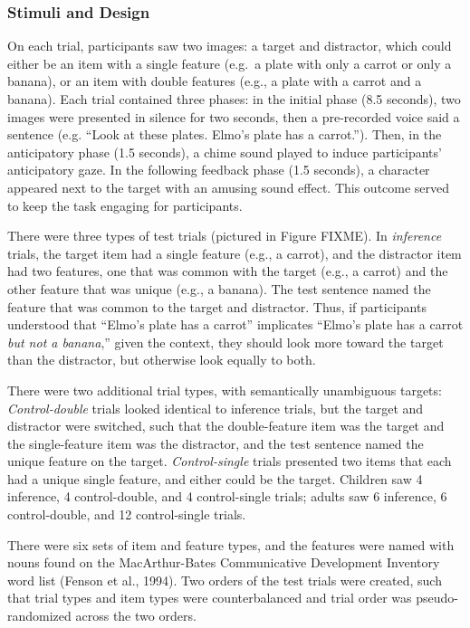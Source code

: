 \documentclass[a4paper,man,apacite,floatsintext]{apa6}
\begin{document}
\subsubsection{Stimuli and Design}\label{stimuli-and-design}

On each trial, participants saw two images: a target and distractor,
which could either be an item with a single feature (e.g.~a plate with
only a carrot or only a banana), or an item with double features (e.g.,
a plate with a carrot and a banana). Each trial contained three phases:
in the initial phase (8.5 seconds), two images were presented in silence
for two seconds, then a pre-recorded voice said a sentence (e.g. ``Look
at these plates. Elmo's plate has a carrot.''). Then, in the
anticipatory phase (1.5 seconds), a chime sound played to induce
participants' anticipatory gaze. In the following feedback phase (1.5
seconds), a character appeared next to the target with an amusing sound
effect. This outcome served to keep the task engaging for participants.

There were three types of test trials (pictured in Figure FIXME). In
\emph{inference} trials, the target item had a single feature (e.g., a
carrot), and the distractor item had two features, one that was common
with the target (e.g., a carrot) and the other feature that was unique
(e.g., a banana). The test sentence named the feature that was common to
the target and distractor. Thus, if participants understood that
``Elmo's plate has a carrot'' implicates ``Elmo's plate has a carrot
\emph{but not a banana},'' given the context, they should look more
toward the target than the distractor, but otherwise look equally to
both.

There were two additional trial types, with semantically unambiguous
targets: \emph{Control-double} trials looked identical to inference
trials, but the target and distractor were switched, such that the
double-feature item was the target and the single-feature item was the
distractor, and the test sentence named the unique feature on the
target. \emph{Control-single} trials presented two items that each had a
unique single feature, and either could be the target. Children saw 4
inference, 4 control-double, and 4 control-single trials; adults saw 6
inference, 6 control-double, and 12 control-single trials.

There were six sets of item and feature types, and the features were
named with nouns found on the MacArthur-Bates Communicative Development
Inventory word list (Fenson et al., 1994). Two orders of the test trials
were created, such that trial types and item types were counterbalanced
and trial order was pseudo-randomized across the two orders.
\end{document}
